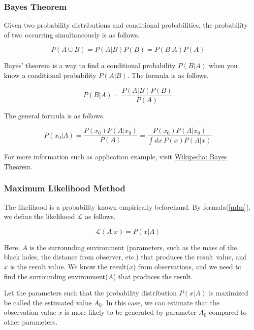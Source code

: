 \subsubsection{Bayes Theorem}

Given two probability distributions and conditional probabilities, the probability of two occurring simultaneously is as follows.

\begin{equation}
    P(A \cup B) = P(A|B) P(B) = P(B|A) P(A)
\end{equation}

Bayes' theorem is a way to find a conditional probability $P(B|A)$ when you know a conditional probability $P(A|B)$. The formula is as follows.

\begin{equation}
    P(B|A) = \frac{P(A|B)P(B)}{P(A)}
\end{equation}

The general formula is as follows.

\begin{equation}\label{mlm}
    P(x_0|A) = \frac{P(x_0) P(A|x_0)}{P(A)} = \frac{P(x_0) P(A|x_0)}{\int dx \ P(x) P(A|x)}
\end{equation}

For more information such as application example, visit \href{https://en.wikipedia.org/wiki/Bayes%27_theorem}{Wikipedia: Bayes Theorem}.

\subsubsection{Maximum Likelihood Method}

The likelihood is a probability known empirically beforehand. By formula(\ref{mlm}), we define the likelihood $\mathcal{L}$ as follows.

\begin{equation}
    \mathcal{L}(A|x) = P(x|A)
\end{equation}

Here, $A$ is the surrounding environment (parameters, such as the mass of the black holes, the distance from observer, etc.) that produces the result value, and $x$ is the result value. We know the result($x$) from observations, and we need to find the surrounding environment($A$) that produces the result.

Let the parameters such that the probability distribution $P(x|A)$ is maximized be called the estimated value $A_0$. In this case, we can estimate that the observation value $x$ is more likely to be generated by parameter $A_0$ compared to other parameters.

